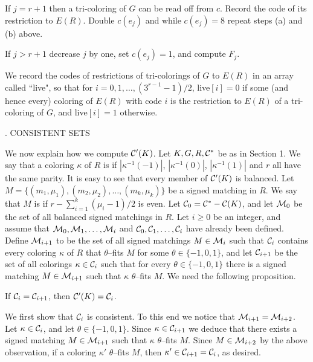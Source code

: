  If $j=r+1$ then a tri-coloring of $G$ can
be read off from $c$. Record the code of its restriction to $E(R)$.
Double $c(e_j)$ and while $c(e_j)=8$ repeat steps (a) and (b)
above.

 If $j>r+1$ decrease $j$ by one, set $c(e_j)=1$,
and compute $F_j$.

We record the codes of restrictions of tri-colorings of $G$ to $E(R)$
in an array called ``live", so that for $i=0,1,\ldots,(3^{r-1}-1)/2$,
live$[i]=0$ if some (and hence every) coloring of $E(R)$ with code
$i$ is the restriction to $E(R)$ of a tri-coloring of $G$, and
live$[i]=1$ otherwise.

. CONSISTENT SETS

We now explain how we compute ${\cal C}'(K)$. Let $K,G,R,{\cal C}^*$ be as in
Section 1. We say that a coloring $\kappa$ of $R$ is 
if $|\kappa^{-1}(-1)|$, $|\kappa^{-1}(0)|$, $|\kappa^{-1}(1)|$ 
and $r$ all have the same parity. It is easy to see that
every member of ${\cal C}'(K)$ is balanced. Let
$M=\{(m_1,\mu_1),(m_2,\mu_2),\ldots,\allowbreak(m_k,\mu_k)\}$ 
be a signed
matching in $R$. We say that $M$ is  if
$r-\sum_{i=1}^k(\mu_i-1)/2$ is even.
Let ${\cal C}_0={\cal C}^*-{\cal C}(K)$, and let ${\cal M}_0$ be
the set of all balanced signed matchings in $R$. Let $i\ge0$ be an
integer, and assume that ${\cal M}_0,
{\cal M}_1,\ldots,{\cal M}_i$ and ${\cal C}_0,{\cal C}_1,\ldots,{\cal C}_i$
have already been defined. Define ${\cal M}_{i+1}$ to be the set
of all signed matchings $M\in{\cal M}_i$ such that ${\cal C}_i$ contains
every coloring
$\kappa$ of $R$ that $\theta$--fits $M$ for some $\theta\in\{-1,0,1\}$,
and let ${\cal C}_{i+1}$ be the set
of all colorings $\kappa\in{\cal C}_i$ such that for every $\theta
\in\{-1,0,1\}$ there is a signed matching $M\in{\cal M}_{i+1}$
such that $\kappa$ $\theta$--fits $M$. We need the following
proposition.

If ${\cal C}_i={\cal C}_{i+1}$, then ${\cal C}'(K)={\cal C}_i$.

\proof We first show that ${\cal C}_i$ is consistent. To this end
we notice that ${\cal M}_{i+1}={\cal M}_{i+2}$. Let $\kappa\in{\cal C}_i$, and
let $\theta\in\{-1,0,1\}$. Since $\kappa\in{\cal C}_{i+1}$ we deduce
that there exists a signed matching $M\in{\cal M}_{i+1}$ such that
$\kappa$ $\theta$--fits $M$. Since $M\in{\cal M}_{i+2}$ by the
above observation, if a coloring $\kappa'$ $\theta$--fits $M$,
then $\kappa'\in{\cal C}_{i+1}={\cal C}_i$, as desired.

